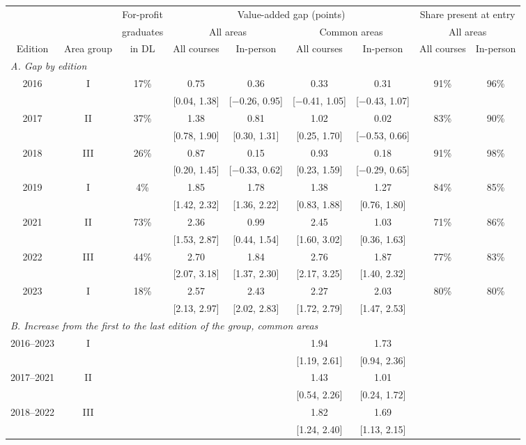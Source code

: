 \begin{tabular}{ccccccccc}
\toprule
 & & For-profit & \multicolumn{4}{c}{Value-added gap (points)} & \multicolumn{2}{c}{Share present at entry} \\
\cmidrule(lr){4-7}\cmidrule(lr){8-9}
 & & graduates & \multicolumn{2}{c}{All areas} & \multicolumn{2}{c}{Common areas} & \multicolumn{2}{c}{All areas} \\
\cmidrule(lr){4-5}\cmidrule(lr){6-7}\cmidrule(lr){8-9}
Edition & Area group & in DL & All courses & In-person & All courses & In-person & All courses & In-person \\
\midrule
\multicolumn{9}{l}{\textit{A. Gap by edition}} \\
2016 & I & 17\% & 0.75 & 0.36 & 0.33 & 0.31 & 91\% & 96\% \\
 & & & [0.04, 1.38] & [$-$0.26, 0.95] & [$-$0.41, 1.05] & [$-$0.43, 1.07] & & \\[2pt]
2017 & II & 37\% & 1.38 & 0.81 & 1.02 & 0.02 & 83\% & 90\% \\
 & & & [0.78, 1.90] & [0.30, 1.31] & [0.25, 1.70] & [$-$0.53, 0.66] & & \\[2pt]
2018 & III & 26\% & 0.87 & 0.15 & 0.93 & 0.18 & 91\% & 98\% \\
 & & & [0.20, 1.45] & [$-$0.33, 0.62] & [0.23, 1.59] & [$-$0.29, 0.65] & & \\[2pt]
2019 & I & 4\% & 1.85 & 1.78 & 1.38 & 1.27 & 84\% & 85\% \\
 & & & [1.42, 2.32] & [1.36, 2.22] & [0.83, 1.88] & [0.76, 1.80] & & \\[2pt]
2021 & II & 73\% & 2.36 & 0.99 & 2.45 & 1.03 & 71\% & 86\% \\
 & & & [1.53, 2.87] & [0.44, 1.54] & [1.60, 3.02] & [0.36, 1.63] & & \\[2pt]
2022 & III & 44\% & 2.70 & 1.84 & 2.76 & 1.87 & 77\% & 83\% \\
 & & & [2.07, 3.18] & [1.37, 2.30] & [2.17, 3.25] & [1.40, 2.32] & & \\[2pt]
2023 & I & 18\% & 2.57 & 2.43 & 2.27 & 2.03 & 80\% & 80\% \\
 & & & [2.13, 2.97] & [2.02, 2.83] & [1.72, 2.79] & [1.47, 2.53] & & \\[2pt]
\midrule
\multicolumn{9}{l}{\textit{B. Increase from the first to the last edition of the group, common areas}} \\
2016--2023 & I & & & & 1.94 & 1.73 & & \\
 & & & & & [1.19, 2.61] & [0.94, 2.36] & & \\[2pt]
2017--2021 & II & & & & 1.43 & 1.01 & & \\
 & & & & & [0.54, 2.26] & [0.24, 1.72] & & \\[2pt]
2018--2022 & III & & & & 1.82 & 1.69 & & \\
 & & & & & [1.24, 2.40] & [1.13, 2.15] & & \\[2pt]
\bottomrule
\end{tabular}